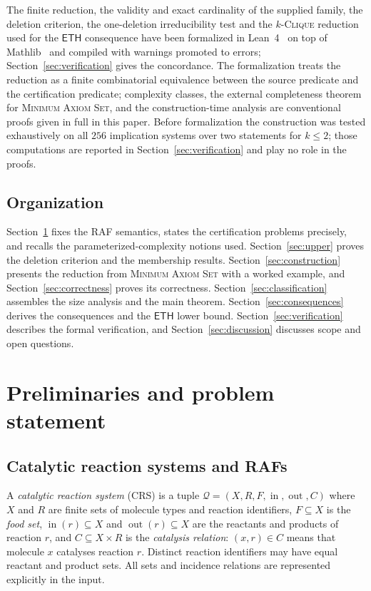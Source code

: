 \documentclass[11pt,a4paper]{article}
\theoremstyle{plain}
\theoremstyle{definition}
\theoremstyle{remark}
\newcommand{\inn}{\operatorname{in}}
\newcommand{\out}{\operatorname{out}}
\newcommand{\MAS}{\textup{\textsc{Minimum Axiom Set}}}
\newcommand{\Clique}{\textup{\textsc{Clique}}}
\newcommand{\ETH}{\mathsf{ETH}}
\newcommand{\cQ}{\mathcal{Q}}
\begin{document}
The finite reduction, the validity and exact cardinality of the supplied family, the deletion criterion, the one-deletion irreducibility test and the $k$-\Clique{} reduction used for the $\ETH$ consequence have been formalized in Lean~4~\cite{demoura2021lean4} on top of Mathlib~\cite{mathlib2020} and compiled with warnings promoted to errors; Section~\ref{sec:verification} gives the concordance. The formalization treats the reduction as a finite combinatorial equivalence between the source predicate and the certification predicate; complexity classes, the external completeness theorem for \MAS, and the construction-time analysis are conventional proofs given in full in this paper. Before formalization the construction was tested exhaustively on all $256$ implication systems over two statements for $k\le 2$; those computations are reported in Section~\ref{sec:verification} and play no role in the proofs.

\subsection*{Organization}

Section~\ref{sec:prelim} fixes the RAF semantics, states the certification problems precisely, and recalls the parameterized-complexity notions used. Section~\ref{sec:upper} proves the deletion criterion and the membership results. Section~\ref{sec:construction} presents the reduction from \MAS{} with a worked example, and Section~\ref{sec:correctness} proves its correctness. Section~\ref{sec:classification} assembles the size analysis and the main theorem. Section~\ref{sec:consequences} derives the consequences and the $\ETH$ lower bound. Section~\ref{sec:verification} describes the formal verification, and Section~\ref{sec:discussion} discusses scope and open questions.

\section{Preliminaries and problem statement}\label{sec:prelim}

\subsection{Catalytic reaction systems and RAFs}\label{sec:crs}

A \emph{catalytic reaction system} (CRS) is a tuple $\cQ=(X,R,F,\inn,\out,C)$ where $X$ and $R$ are finite sets of molecule types and reaction identifiers, $F\subseteq X$ is the \emph{food set}, $\inn(r)\subseteq X$ and $\out(r)\subseteq X$ are the reactants and products of reaction $r$, and $C\subseteq X\times R$ is the \emph{catalysis relation}: $(x,r)\in C$ means that molecule $x$ catalyses reaction $r$. Distinct reaction identifiers may have equal reactant and product sets. All sets and incidence relations are represented explicitly in the input.
\end{document}
